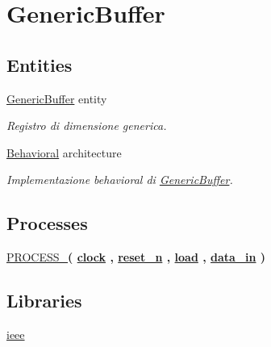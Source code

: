 \hypertarget{group___generic_buffer}{\section{Generic\+Buffer}
\label{group___generic_buffer}
}
\subsection*{Entities}
\begin{DoxyCompactItemize}
\item 
\hyperlink{class_generic_buffer}{Generic\+Buffer} entity
\begin{DoxyCompactList}\small\item\em Registro di dimensione generica. \end{DoxyCompactList}\item 
\hyperlink{class_generic_buffer_1_1_behavioral}{Behavioral} architecture
\begin{DoxyCompactList}\small\item\em Implementazione behavioral di \hyperlink{class_generic_buffer}{Generic\+Buffer}. \end{DoxyCompactList}\end{DoxyCompactItemize}
\subsection*{Processes}
 \begin{DoxyCompactItemize}
\item 
\hyperlink{group___generic_buffer_ga2ee480e118ca2b3fccf26139a66e84ad}{P\+R\+O\+C\+E\+S\+S\+\_}{\bfseries  ( {\bfseries {\bfseries \hyperlink{group___generic_buffer_gadfc2d5e995e9c6876b2e55bf6a5c4071}{clock}} \textcolor{vhdlchar}{ }} , {\bfseries {\bfseries \hyperlink{group___generic_buffer_ga446ea52ed8c4a84181a47d9165ce41a5}{reset\+\_\+n}} \textcolor{vhdlchar}{ }} , {\bfseries {\bfseries \hyperlink{group___generic_buffer_gaba761f7740d0b6257a0e283b3734ddbf}{load}} \textcolor{vhdlchar}{ }} , {\bfseries {\bfseries \hyperlink{group___generic_buffer_ga597910698848749da5951285c85fa4f9}{data\+\_\+in}} \textcolor{vhdlchar}{ }} )}
\end{DoxyCompactItemize}
\subsection*{Libraries}
 \begin{DoxyCompactItemize}
\item 
\hyperlink{group___generic_buffer_ga0a6af6eef40212dbaf130d57ce711256}{ieee} 
\end{DoxyCompactItemize}
